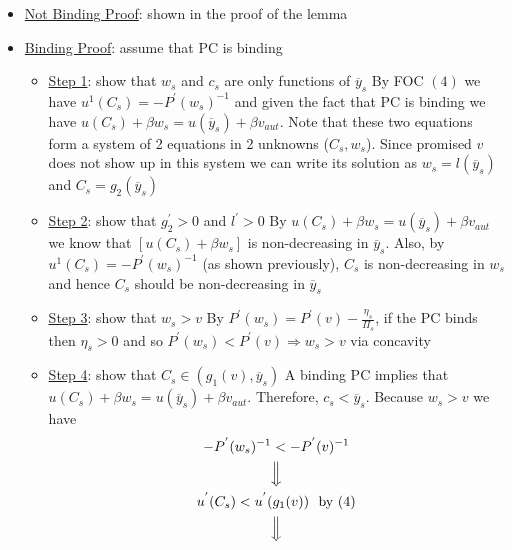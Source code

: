 \documentclass{article}
\begin{document}
\begin{itemize}
\begin{itemize}
\begin{center}
            \end{center}
        \item  \underline{Not Binding Proof}: shown in the proof of the lemma
        \item  \underline{Binding Proof}: assume that PC is binding
        \begin{itemize}
            \item \underline{Step 1}: show that $w_{s}$ and $c_{s}$ are only functions of $\overline{y}_{s}$
            \newline
            By FOC $(4)$ we have $u^{1} (C_{s}) = -P^{'}(w_{s})^{-1}$ and given the fact that PC is binding we have $u(C_{s}) + \beta w_{s} = u(\overline{y}_{s}) + \beta v_{aut}$. Note that these two equations form a system of 2 equations in 2 unknowns ($C_{s}, w_{s}$). Since promised $v$ does not show up in this system we can write its solution as $w_{s} =l(\overline{y}_{s})$ and $C_{s} = g_{2}(\overline{y}_{s})$
            \item  \underline{Step 2}: show that $g_{2}^{'} > 0$ and $l^{'} > 0$
            \newline
            By $u(C_{s}) + \beta w_{s} = u(\overline{y}_{s}) + \beta v_{aut}$ we know that $[u(C_{s}) + \beta w_{s}]$ is non-decreasing in $\overline{y}_{s}$. Also, by $u^{1} (C_{s}) = -P^{'}(w_{s})^{-1}$ (as shown previously), $C_{s}$ is non-decreasing in $w_{s}$ and hence $C_{s}$ should be non-decreasing in $\overline{y}_{s}$
            \item  \underline{Step 3}: show that $w_{s} > v$
            \newline
            By $P^{'}(w_{s}) = P^{'}(v) - \tfrac{\eta_{s}}{\Pi_{s}}$, if the PC binds then $\eta_{s} > 0$ and so $P^{'}(w_{s}) < P^{'}(v) \Rightarrow w_{s} > v$ via concavity
            \item  \underline{Step 4}: show that $C_{s} \in (g_{1}(v), \overline{y}_{s})$
            \newline
            A binding PC implies that $u(C_{s}) + \beta w_{s} = u(\overline{y}_{s}) + \beta v_{aut}$. Therefore, $c_{s} < \overline{y}_{s}$. Because $w_{s} > v$ we have
            \begin{gather*}
                -P^{'}(w_{s})^{-1} < -P^{'}(v)^{-1} \\
                \Big\Downarrow \\
                u^{'}(C_{s}) < u^{'}(g_{1}(v)) \ \ \text{by (4)} \\
                \Big\Downarrow \\

\end{gather*}
\end{itemize}
\end{itemize}
\end{itemize}
\end{document}
